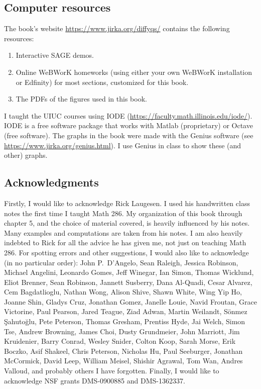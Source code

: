 \subsection*{Computer resources}

The book's
website \url{https://www.jirka.org/diffyqs/}
contains the following resources:
\begin{enumerate}
\item Interactive SAGE demos.
\item Online WeBWorK homeworks
(using either your own WeBWorK installation or Edfinity)
for most sections, customized for this book.
\item The PDFs of the figures used in this book.
\end{enumerate}

I taught the UIUC courses using IODE
(\url{https://faculty.math.illinois.edu/iode/}).
IODE is a free software package that
works with Matlab (proprietary) or Octave (free software).
The graphs in the book were made with
the Genius software
(see \url{https://www.jirka.org/genius.html}).  I use Genius
in class to show these (and other) graphs.



\subsection*{Acknowledgments}

Firstly, I would like to acknowledge Rick Laugesen.  I used his handwritten
class notes
the first time I taught
Math 286.  My organization of this book through chapter 5,
and the choice of
material covered, is heavily influenced by his notes.  Many
examples and computations are taken from his notes.  I am also heavily
indebted to Rick for all the advice he has given me, not just on teaching
Math 286.
For spotting errors and other suggestions,
I would also like to acknowledge (in no particular order):
John P.\ D'Angelo,
Sean Raleigh, Jessica Robinson, Michael Angelini, Leonardo Gomes, Jeff
Winegar, Ian Simon, Thomas Wicklund, Eliot Brenner, Sean Robinson,
Jannett Susberry, Dana Al-Quadi, Cesar Alvarez, Cem Bagdatlioglu,
Nathan Wong, Alison Shive, Shawn White, Wing Yip Ho, Joanne Shin,
Gladys Cruz, Jonathan Gomez, Janelle Louie, Navid Froutan,
Grace Victorine, Paul Pearson, Jared Teague, Ziad Adwan,
Martin Weilandt, S\"{o}nmez \c{S}ahuto\u{g}lu,
Pete Peterson, Thomas Gresham, Prentiss Hyde, Jai Welch,
Simon Tse, Andrew Browning, James Choi, Dusty Grundmeier,
John Marriott,
Jim Kruidenier,
Barry Conrad,
Wesley Snider,
Colton Koop,
Sarah Morse,
Erik Boczko,
Asif Shakeel,
Chris Peterson,
Nicholas Hu,
Paul Seeburger,
Jonathan McCormick,
David Leep,
William Meisel,
Shishir Agrawal,
Tom Wan,
Andres Valloud,
and probably others I
have forgotten.
Finally, I would like
to acknowledge NSF grants DMS-0900885 and DMS-1362337.